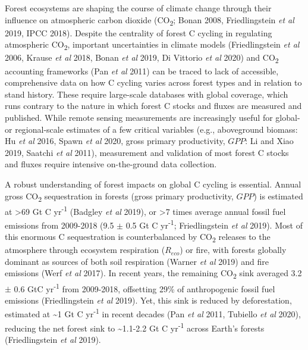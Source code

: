 \documentclass[
]{article}
\begin{document}
Forest ecosystems are shaping the course of climate change through their
influence on atmospheric carbon dioxide (CO\textsubscript{2}; Bonan
2008, Friedlingstein \emph{et al} 2019, IPCC 2018). Despite the
centrality of forest C cycling in regulating atmospheric
CO\textsubscript{2}, important uncertainties in climate models
(Friedlingstein \emph{et al} 2006, Krause \emph{et al} 2018, Bonan
\emph{et al} 2019, Di Vittorio \emph{et al} 2020) and
CO\textsubscript{2} accounting frameworks (Pan \emph{et al} 2011) can be
traced to lack of accessible, comprehensive data on how C cycling varies
across forest types and in relation to stand history. These require
large-scale databases with global coverage, which runs contrary to the
nature in which forest C stocks and fluxes are measured and published.
While remote sensing measurements are increasingly useful for global- or
regional-scale estimates of a few critical variables (e.g., aboveground
biomass: Hu \emph{et al} 2016, Spawn \emph{et al} 2020, gross primary
productivity, \(GPP\): Li and Xiao 2019, Saatchi \emph{et al} 2011),
measurement and validation of most forest C stocks and fluxes require
intensive on-the-ground data collection.

A robust understanding of forest impacts on global C cycling is
essential. Annual gross CO\textsubscript{2} sequestration in forests
(gross primary productivity, \(GPP\)) is estimated at \textgreater69 Gt
C yr\textsuperscript{-1} (Badgley \emph{et al} 2019), or \textgreater7
times average annual fossil fuel emissions from 2009-2018 (9.5 \(\pm\)
0.5 Gt C yr\textsuperscript{-1}; Friedlingstein \emph{et al} 2019). Most
of this enormous C sequestration is counterbalanced by
CO\textsubscript{2} releases to the atmosphere through ecosystem
respiration (\(R_{eco}\)) or fire, with forests globally dominant as
sources of both soil respiration (Warner \emph{et al} 2019) and fire
emissions (Werf \emph{et al} 2017). In recent years, the remaining
CO\textsubscript{2} sink averaged 3.2 \(\pm\) 0.6 GtC
yr\textsuperscript{-1} from 2009-2018, offsetting 29\% of anthropogenic
fossil fuel emissions (Friedlingstein \emph{et al} 2019). Yet, this sink
is reduced by deforestation, estimated at \textasciitilde1 Gt C
yr\textsuperscript{-1} in recent decades (Pan \emph{et al} 2011,
Tubiello \emph{et al} 2020), reducing the net forest sink to
\textasciitilde1.1-2.2 Gt C yr\textsuperscript{-1} across Earth's
forests (Friedlingstein \emph{et al} 2019).
\end{document}
